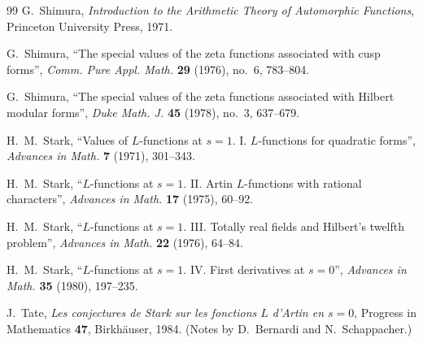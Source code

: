 \documentclass[11pt]{amsart}
\theoremstyle{definition}
\theoremstyle{remark}
\begin{document}
\begin{thebibliography}{99}
G.~Shimura, \emph{Introduction to the Arithmetic Theory of Automorphic
Functions}, Princeton University Press, 1971.

G.~Shimura, ``The special values of the zeta functions associated with
cusp forms'',
\emph{Comm. Pure Appl. Math.} \textbf{29} (1976), no.~6, 783--804.

G.~Shimura, ``The special values of the zeta functions associated with
Hilbert modular forms'',
\emph{Duke Math. J.} \textbf{45} (1978), no.~3, 637--679.

H.~M.~Stark, ``Values of \(L\)-functions at \(s = 1\). I. \(L\)-functions
for quadratic forms'',
\emph{Advances in Math.} \textbf{7} (1971), 301--343.

H.~M.~Stark, ``\(L\)-functions at \(s = 1\). II. Artin \(L\)-functions
with rational characters'',
\emph{Advances in Math.} \textbf{17} (1975), 60--92.

H.~M.~Stark, ``\(L\)-functions at \(s = 1\). III. Totally real fields
and Hilbert's twelfth problem'',
\emph{Advances in Math.} \textbf{22} (1976), 64--84.

H.~M.~Stark, ``\(L\)-functions at \(s = 1\). IV. First derivatives at
\(s = 0\)'',
\emph{Advances in Math.} \textbf{35} (1980), 197--235.

J.~Tate, \emph{Les conjectures de Stark sur les fonctions \(L\)
d'Artin en \(s = 0\)}, Progress in Mathematics \textbf{47},
Birkh\"auser, 1984. (Notes by D.~Bernardi and N.~Schappacher.)

\end{thebibliography}
\end{document}
